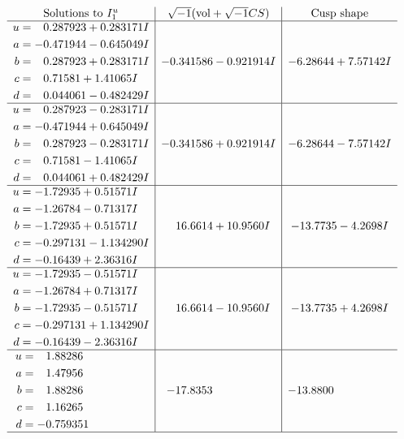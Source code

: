 \documentclass[1p]{elsarticle_modified}
\theoremstyle{definition}
\newcommand{\I}{\sqrt{-1}}
\begin{document}
$$\begin{array}{c|c|c}  
\text{Solutions to }I^u_{1}& \I (\text{vol} + \sqrt{-1}CS) & \text{Cusp shape}\\
 \hline 
\begin{aligned}
u &= \phantom{-}0.287923 + 0.283171 I \\
a &= -0.471944 - 0.645049 I \\
b &= \phantom{-}0.287923 + 0.283171 I \\
c &= \phantom{-}0.71581 + 1.41065 I \\
d &= \phantom{-}0.044061 - 0.482429 I\end{aligned}
 & -0.341586 - 0.921914 I & -6.28644 + 7.57142 I \\ \hline\begin{aligned}
u &= \phantom{-}0.287923 - 0.283171 I \\
a &= -0.471944 + 0.645049 I \\
b &= \phantom{-}0.287923 - 0.283171 I \\
c &= \phantom{-}0.71581 - 1.41065 I \\
d &= \phantom{-}0.044061 + 0.482429 I\end{aligned}
 & -0.341586 + 0.921914 I & -6.28644 - 7.57142 I \\ \hline\begin{aligned}
u &= -1.72935 + 0.51571 I \\
a &= -1.26784 - 0.71317 I \\
b &= -1.72935 + 0.51571 I \\
c &= -0.297131 - 1.134290 I \\
d &= -0.16439 + 2.36316 I\end{aligned}
 & \phantom{-}16.6614 + 10.9560 I & -13.7735 - 4.2698 I \\ \hline\begin{aligned}
u &= -1.72935 - 0.51571 I \\
a &= -1.26784 + 0.71317 I \\
b &= -1.72935 - 0.51571 I \\
c &= -0.297131 + 1.134290 I \\
d &= -0.16439 - 2.36316 I\end{aligned}
 & \phantom{-}16.6614 - 10.9560 I & -13.7735 + 4.2698 I \\ \hline\begin{aligned}
u &= \phantom{-}1.88286\phantom{ +0.000000I} \\
a &= \phantom{-}1.47956\phantom{ +0.000000I} \\
b &= \phantom{-}1.88286\phantom{ +0.000000I} \\
c &= \phantom{-}1.16265\phantom{ +0.000000I} \\
d &= -0.759351\phantom{ +0.000000I}\end{aligned}
 & -17.8353\phantom{ +0.000000I} & -13.8800\phantom{ +0.000000I}\\
 \hline 
 \end{array}$$\newpage\newpage\renewcommand{\arraystretch}{1}
\end{document}
